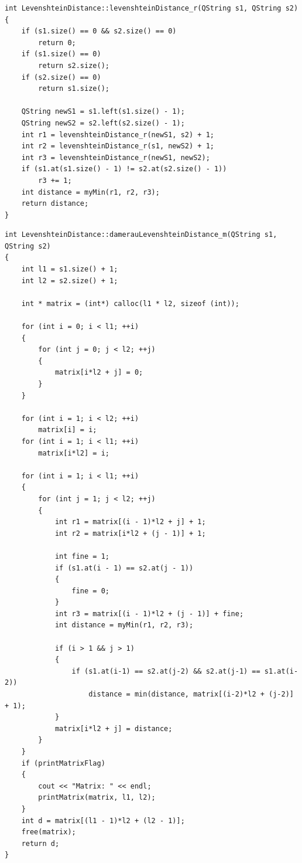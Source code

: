 \documentclass[14pt]{report}
\begin{document}
\begin{lstlisting}[label=some-code,caption=Функция для нахождения расстояния Левенштейна рекурсивно]
int LevenshteinDistance::levenshteinDistance_r(QString s1, QString s2)
{
    if (s1.size() == 0 && s2.size() == 0)
        return 0;
    if (s1.size() == 0)
        return s2.size();
    if (s2.size() == 0)
        return s1.size();

    QString newS1 = s1.left(s1.size() - 1);
    QString newS2 = s2.left(s2.size() - 1);
    int r1 = levenshteinDistance_r(newS1, s2) + 1;
    int r2 = levenshteinDistance_r(s1, newS2) + 1;
    int r3 = levenshteinDistance_r(newS1, newS2);
    if (s1.at(s1.size() - 1) != s2.at(s2.size() - 1))
        r3 += 1;
    int distance = myMin(r1, r2, r3);
    return distance;
}
\end{lstlisting}

\begin{lstlisting}[label=some-code,caption=Функция для нахождения расстояния Дамерау-Левенштейна матрично]
int LevenshteinDistance::damerauLevenshteinDistance_m(QString s1, QString s2)
{
    int l1 = s1.size() + 1;
    int l2 = s2.size() + 1;

    int * matrix = (int*) calloc(l1 * l2, sizeof (int));

    for (int i = 0; i < l1; ++i)
    {
        for (int j = 0; j < l2; ++j)
        {
            matrix[i*l2 + j] = 0;
        }
    }

    for (int i = 1; i < l2; ++i)
        matrix[i] = i;
    for (int i = 1; i < l1; ++i)
        matrix[i*l2] = i;

    for (int i = 1; i < l1; ++i)
    {
        for (int j = 1; j < l2; ++j)
        {
            int r1 = matrix[(i - 1)*l2 + j] + 1;
            int r2 = matrix[i*l2 + (j - 1)] + 1;

            int fine = 1;
            if (s1.at(i - 1) == s2.at(j - 1))
            {
                fine = 0;
            }
            int r3 = matrix[(i - 1)*l2 + (j - 1)] + fine;
            int distance = myMin(r1, r2, r3);

            if (i > 1 && j > 1)
            {
                if (s1.at(i-1) == s2.at(j-2) && s2.at(j-1) == s1.at(i-2))
                    distance = min(distance, matrix[(i-2)*l2 + (j-2)] + 1);
            }
            matrix[i*l2 + j] = distance;
        }
    }
    if (printMatrixFlag)
    {
        cout << "Matrix: " << endl;
        printMatrix(matrix, l1, l2);
    }
    int d = matrix[(l1 - 1)*l2 + (l2 - 1)];
    free(matrix);
    return d;
}
\end{lstlisting}
\end{document}
